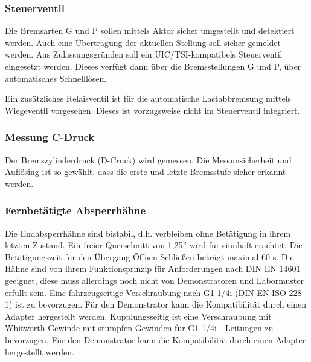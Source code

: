 \subsubsection{Steuerventil}
Die Bremsarten G und P sollen mittels Aktor sicher umgestellt und detektiert werden. Auch eine Übertragung der aktuellen Stellung soll sicher gemeldet werden. Aus Zulassungsgründen soll ein UIC/TSI-kompatibels Steuerventil eingesetzt werden. Dieses verfügt dann über die Bremsstellungen G und P, über automatisches Schnelllösen. \par
Ein zusätzliches Relaisventil ist für die automatische Lastabbremsung mittels Wiegeventil vorgesehen. Dieses ist vorzugsweise nicht im Steuerventil integriert.

\subsubsection{Messung C-Druck}
Der Bremszylinderdruck (D-Cruck) wird gemessen. 
Die Messunsicherheit und Auflösing ist so gewählt, dass die erste und letzte Bremsstufe %
sicher erkannt werden. %

\subsubsection{Fernbetätigte Absperrhähne}
Die Endabsperrhähne sind bistabil, d.h. verbleiben ohne Betätigung in ihrem letzten Zustand. Ein freier Querschnitt von 1,25'' wird für sinnhaft erachtet. Die Betätigungszeit für den Übergang Öffnen-Schließen beträgt maximal 60 s. Die Hähne sind von ihrem Funktionsprinzip für Anforderungen nach DIN EN 14601 geeignet, diese muss allerdings noch nicht von Demonstratoren und Labormuster erfüllt sein. Eine fahrzeugseitige Verschraubung nach G1 1$/$4i (DIN EN ISO 228-1) ist zu bevorzugen. Für den Demonstrator kann die Kompatibilität durch einen Adapter hergestellt werden. Kupplungsseitig ist eine Verschraubung mit Whitworth-Gewinde mit stumpfen Gewinden für G1 1$⁄$4i—Leitungen zu bevorzugen. Für den Demonstrator kann die Kompatibilität durch einen Adapter hergestellt werden.

